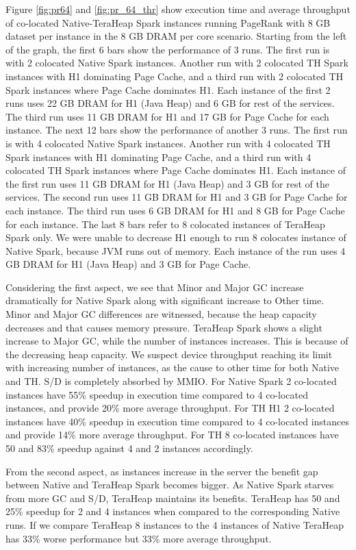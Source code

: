 Figure \ref{fig:pr64} and \ref{fig:pr_64_thr} show execution time and average throughput of co-located
Native-TeraHeap Spark instances running PageRank with 8 GB
dataset per instance in the 8 GB DRAM per core scenario.
Starting from the left of the graph, the first 6 bars show the
performance of 3 runs. The first run is with 2 colocated Native Spark instances.
Another run with 2 colocated TH Spark instances with H1 dominating Page Cache,
and a third run with 2 colocated TH Spark instances where Page Cache dominates H1.
Each instance of the first 2 runs uses 22 GB DRAM for H1 (Java Heap) and 6 GB for rest of the services.
The third run uses 11 GB DRAM for H1 and 17 GB for Page Cache for each instance. 
The next 12 bars show the performance of another 3 runs. The first run is with 4 colocated Native Spark instances.
Another run with 4 colocated TH Spark instances with H1 dominating Page Cache,
and a third run with 4 colocated TH Spark instances where Page Cache dominates H1.
Each instance of the first run uses 11 GB DRAM for H1 (Java Heap) and 3 GB for rest of the services.
The second run uses 11 GB DRAM for H1 and 3 GB for Page Cache for each instance.
The third run uses 6 GB DRAM for H1 and 8 GB for Page Cache for each instance.
The last 8 bars refer to 8 colocated instances of TeraHeap Spark only. 
We were unable to decrease H1 enough to run 8 colocates instance of Native Spark,
because JVM runs out of memory. Each instance of the run uses 4 GB DRAM for H1 (Java Heap) and 3 GB for Page Cache.

Considering the first aspect, we see that Minor and Major GC increase dramatically for Native Spark along with significant increase to Other time. Minor and Major GC differences are witnessed, because the heap capacity decreases and that causes memory pressure. TeraHeap Spark shows a slight increase to Major GC, while the number of instances increases. This is because of the decreasing heap capacity. We suspect device throughput reaching its limit with increasing number of instances, as the cause to other time for both Native and TH. S/D is completely absorbed by MMIO. For Native Spark 2 co-located instances have 55\% speedup in execution time compared to 4 co-located instances, and provide 20\% more average throughput. For TH H1 2 co-located instances have 40\% speedup in execution time compared to 4 co-located instances and provide 14\% more average throughput. For TH 8 co-located instances have 50 and 83\% speedup against 4 and 2 instances accordingly.

From the second aspect, as instances increase in the server the benefit gap between Native and TeraHeap Spark becomes bigger. As Native Spark starves from more GC and S/D, TeraHeap maintains its benefits. TeraHeap has 50 and 25\% speedup for 2 and 4 instances when compared to the corresponding Native runs. If we compare TeraHeap 8 instances to the 4 instances of Native TeraHeap has 33\% worse performance but 33\% more average throughput.

